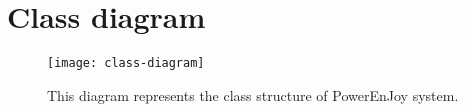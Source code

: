 \section{Class diagram}

\begin{figure}[H]
	\centering
	\texttt{[image: class-diagram]}
	\caption[Class diagram]{This diagram represents the class structure of PowerEnJoy system.}
	\label{fig:class-diagram}
\end{figure}